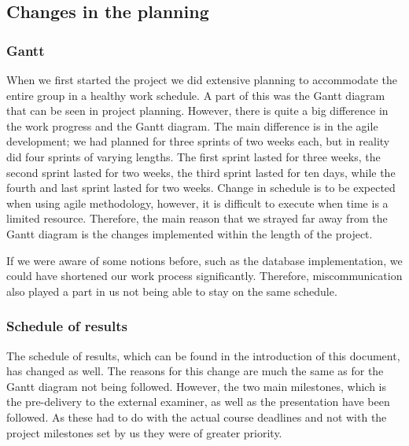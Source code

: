\documentclass[../document.tex]{subfiles}
\begin{document}
\subsection{Changes in the planning}

\subsubsection{Gantt}
When we first started the project we did extensive planning to accommodate the entire group in a healthy work schedule. A part of this was the Gantt diagram that can be seen in project planning. However, there is quite a big difference in the work progress and the Gantt diagram. The main difference is in the agile development; we had planned for three sprints of two weeks each, but in reality did four sprints of varying lengths. The first sprint lasted for three weeks, the second sprint lasted for two weeks, the third sprint lasted for ten days, while the fourth and last sprint lasted for two weeks. Change in schedule is to be expected when using agile methodology, however, it is difficult to execute when time is a limited resource. Therefore, the main reason that we strayed far away from the Gantt diagram is the changes implemented within the length of the project. 

If we were aware of some notions before, such as the database implementation, we could have shortened our work process significantly. Therefore, miscommunication also played a part in us not being able to stay on the same schedule.

\subsubsection{Schedule of results}
The schedule of results, which can be found in the introduction of this document, has changed as well. The reasons for this change are much the same as for the Gantt diagram not being followed. However, the two main milestones, which is the pre-delivery to the external examiner, as well as the presentation have been followed. As these had to do with the actual course deadlines and not with the project milestones set by us they were of greater priority.
\end{document}
